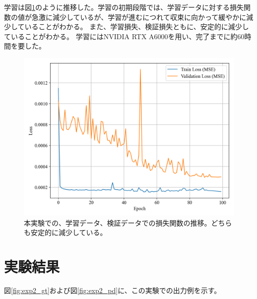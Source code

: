   学習は図\ref{fig:exp2_learn_progress}のように推移した。学習の初期段階では、学習データに対する損失関数の値が急激に減少しているが、学習が進むにつれて収束に向かって緩やかに減少していることがわかる。
  また、学習損失、検証損失ともに、安定的に減少していることがわかる。
  学習にはNVIDIA RTX A6000を用い、完了までに約60時間を要した。
  \begin{figure}[htbp]
    \centering
    \includegraphics[width=\textwidth]{figures/exp1/loss.png}
    \caption{本実験での、学習データ、検証データでの損失関数の推移。どちらも安定的に減少している。}
    \label{fig:exp2_learn_progress}
  \end{figure}

  \section{実験結果}
    図\ref{fig:exp2_gt}および図\ref{fig:exp2_pd}に、この実験での出力例を示す。

